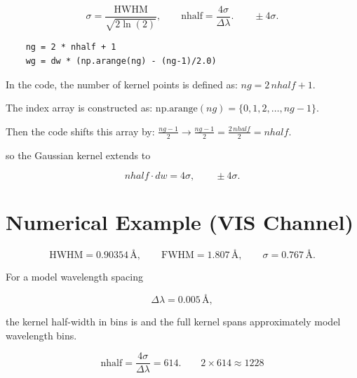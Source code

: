 \documentclass[11pt]{article}
\begin{document}
\[
    \sigma = \frac{\mathrm{HWHM}}{\sqrt{2\ln(2)}},
    \qquad
    \text{nhalf}
    =
    \frac{4\sigma}{\Delta\lambda}.
    \qquad
    \pm 4\sigma.
\]


\begin{verbatim}
    ng = 2 * nhalf + 1
    wg = dw * (np.arange(ng) - (ng-1)/2.0)

\end{verbatim}

In the code, the number of kernel points is defined as: \(  ng = 2\,nhalf + 1. \)

The index array is constructed as: \(  \text{np.arange}(ng) = \{0,1,2,\dots,ng-1\}. \)

Then the code shifts this array by: \(  \frac{ng-1}{2} \rightarrow  \frac{ng-1}{2} = \frac{2\,nhalf}{2} = nhalf. \)

so the Gaussian kernel extends to

\[
    nhalf \cdot dw = 4\sigma,
    \qquad
    \pm 4\sigma.
\]

\section*{Numerical Example (VIS Channel)}

\[
    \mathrm{HWHM} = 0.90354 \,\text{\AA},
    \qquad
    \mathrm{FWHM} = 1.807 \,\text{\AA},
    \qquad
    \sigma = 0.767 \,\text{\AA}.
\]

For a model wavelength spacing

\[
    \Delta\lambda = 0.005 \,\text{\AA},
\]

the kernel half-width in bins is and the full kernel spans approximately model wavelength bins.

\[
    \text{nhalf}
    =
    \frac{4\sigma}{\Delta\lambda}
    =
    614.
    \qquad
    2 \times 614 \approx 1228
\]
\end{document}
